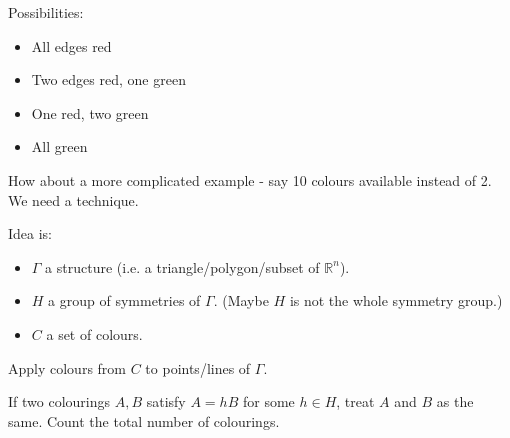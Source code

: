 \documentclass{article}
\theoremstyle{definition} \newtheorem*{definition}{Definition}
\newcommand{\reals}{\mathbb{R}} \newcommand{\rationals}{\mathbb{Q}}
\begin{document}
  Possibilities: \begin{itemize} \item All edges red \item Two edges red, one
      green \item One red, two green \item All green \end{itemize} How about a
    more complicated example - say 10 colours available instead of 2. We need a
    technique.

 Idea is: \begin{itemize} \item $\Gamma$ a structure (i.e. a
     triangle/polygon/subset of $\reals^n$).  \item $H$ a group of symmetries
     of $\Gamma$. (Maybe $H$ is not the whole symmetry group.) \item $C$ a set
       of colours.  \end{itemize}

 Apply colours from $C$ to points/lines of $\Gamma$.

 If two colourings $A,B$ satisfy $A=hB$ for some $h \in H$, treat $A$ and $B$
 as the same. Count the total number of colourings.\\
\end{document}
